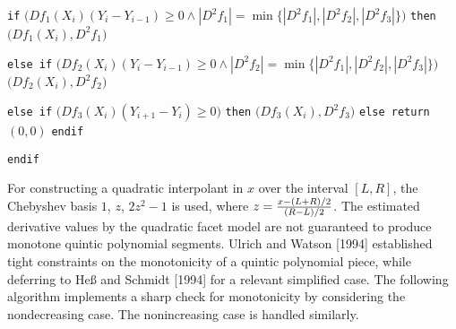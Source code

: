 {\itemitem{} {\tt if} $\bigl(Df_1(X_i)(Y_i-Y_{i-1}) \ge 0 \wedge
  |D^2f_1| = \min\bigl\{ |D^2f_1|,
  |D^2f_2|, |D^2f_3|\bigr\} \bigr)$ {\tt then}
\itemitem{}  $\bigl(Df_1(X_i),D^2f_1\bigr)$

\itemitem{} {\tt else if} $\bigl(Df_2(X_i)(Y_i-Y_{i-1}) \ge 0 \wedge
  |D^2f_2| = \min\bigl\{ |D^2f_1|,
  |D^2f_2|, |D^2f_3|\bigr\} \bigr)$
\itemitem{}  $\bigl(Df_2(X_i),D^2f_2\bigr)$

\itemitem{} {\tt else if} $\bigl(Df_3(X_i)(Y_{i+1}-Y_i) \ge 0\bigr)$ {\tt then}
\itemitem{}  $\bigl(Df_3(X_i),D^2f_3\bigr)$
\itemitem{} {\tt else return} $(0, 0)$
\itemitem{} {\tt endif}
\item{} {\tt endif}
}
\vskip 5mm

For constructing a quadratic interpolant in $x$ over the interval
$[L,R]$, the Chebyshev basis $1$, $z$, $2z^2-1$ is used, where
$z={x-(L+R)/2 \over (R-L)/2}$. The estimated derivative values by the
quadratic facet model are not guaranteed to produce monotone quintic
polynomial segments. Ulrich and Watson [1994] established tight
constraints on the monotonicity of a quintic polynomial piece, while
deferring to He{\ss} and Schmidt [1994] for a relevant simplified
case. The following algorithm implements a sharp check for
monotonicity by considering the nondecreasing case. The nonincreasing
case is handled similarly.

